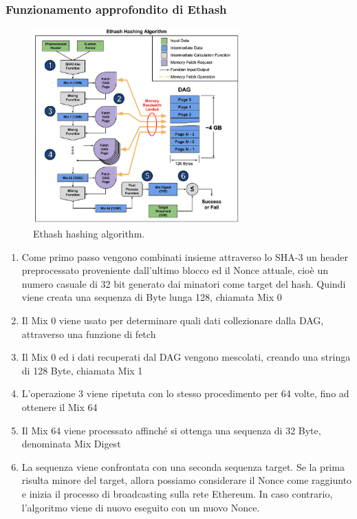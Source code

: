 \documentclass[a4paper,11pt]{report}
\begin{document}
\subsubsection{Funzionamento approfondito di Ethash}
\begin{figure}[htbp] 
\begin{center}
\includegraphics[width=8cm]{img/ethash.jpg}
\end{center}
\caption{Ethash hashing algorithm. \cite{etlash}}
\end{figure}
\begin{enumerate}
\item Come primo passo vengono combinati insieme attraverso lo SHA-3 un header preprocessato proveniente dall'ultimo blocco ed il Nonce attuale, cioè un numero casuale di 32 bit generato dai minatori come target del hash. Quindi viene creata una sequenza di Byte lunga 128, chiamata Mix 0
\item Il Mix 0 viene usato per determinare quali dati collezionare dalla DAG, attraverso una funzione di fetch
\item Il Mix 0 ed i dati recuperati dal DAG vengono mescolati, creando una stringa di 128 Byte, chiamata Mix 1
\item  L'operazione 3 viene ripetuta con lo stesso procedimento per 64 volte, fino ad ottenere il Mix 64
\item Il Mix 64 viene processato affinché si ottenga una sequenza di 32 Byte, denominata Mix Digest
\item La sequenza viene confrontata con una seconda sequenza target. Se la prima risulta minore del target, allora possiamo considerare il Nonce come raggiunto e inizia il processo di broadcasting sulla rete Ethereum. In caso contrario, l'algoritmo viene di nuovo eseguito con un nuovo Nonce.
\end{enumerate}
\end{document}
